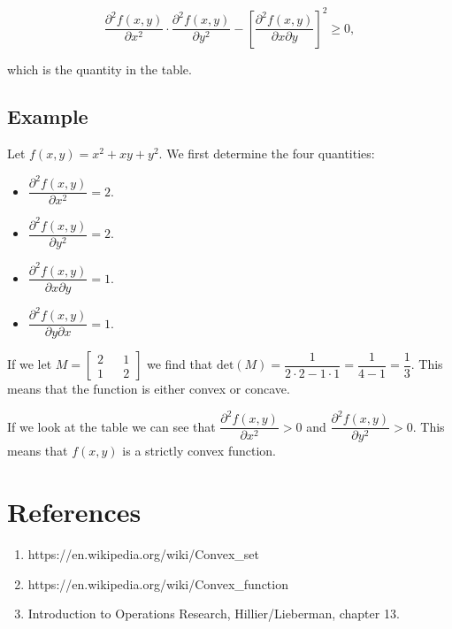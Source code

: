 \documentclass[11pt]{article}
\providecommand{\tightlist}{%
      \setlength{\itemsep}{0pt}\setlength{\parskip}{0pt}}
\begin{document}
\[ \dfrac{\partial^2 f(x,y)}{\partial x^2} \cdot \dfrac{\partial^2 f(x,y)}{\partial y^2} - \left[\dfrac{\partial^2 f(x,y)}{\partial x \partial y}\right]^2 \geq 0,\]

which is the quantity in the table.

    \hypertarget{example}{%
\subsection{Example}\label{example}}

    Let \(f(x,y)=x^2+xy+y^2\). We first determine the four quantities:

\begin{itemize}
\tightlist
\item
  \(\dfrac{\partial^2 f(x,y)}{\partial x^2} = 2\).
\item
  \(\dfrac{\partial^2 f(x,y)}{\partial y^2} = 2\).
\item
  \(\dfrac{\partial^2 f(x,y)}{\partial x \partial y} = 1\).
\item
  \(\dfrac{\partial^2 f(x,y)}{\partial y \partial x} = 1\).
\end{itemize}

If we let \(M=\begin{bmatrix} 2 && 1 \\ 1 && 2 \end{bmatrix}\) we find
that
\(\textrm{det}(M)=\dfrac{1}{2\cdot2-1\cdot1} = \dfrac{1}{4-1} = \dfrac{1}{3}\).
This means that the function is either convex or concave.

If we look at the table we can see that
\(\dfrac{\partial^2 f(x,y)}{\partial x^2} > 0\) and
\(\dfrac{\partial^2 f(x,y)}{\partial y^2} > 0\). This means that
\(f(x,y)\) is a strictly convex function.

    \hypertarget{references}{%
\section{References}\label{references}}

    \begin{enumerate}
\def\labelenumi{\arabic{enumi}.}
\tightlist
\item
  https://en.wikipedia.org/wiki/Convex\_set
\item
  https://en.wikipedia.org/wiki/Convex\_function
\item
  Introduction to Operations Research, Hillier/Lieberman, chapter 13.
\end{enumerate}


    
    
    
    
\end{document}

